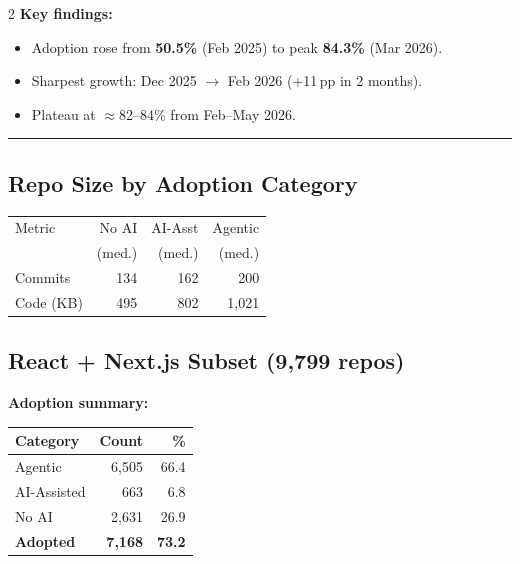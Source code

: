 \documentclass[10pt,a4paper]{article}
\begin{document}
\begin{multicols}{2}
\vspace{3pt}
\textbf{Key findings:}
\begin{itemize}\setlength\itemsep{0pt}
  \item Adoption rose from \textbf{50.5\%} (Feb 2025)
        to peak \textbf{84.3\%} (Mar 2026).
  \item Sharpest growth: Dec 2025 $\to$ Feb 2026
        (+11\,pp in 2 months).
  \item Plateau at $\approx$82--84\% from Feb--May 2026.
\end{itemize}

\vspace{3pt}
\hrule
\vspace{3pt}

\subsection*{Repo Size by Adoption Category}


\vspace{2pt}
\begin{tabular}{@{}lrrr@{}}
\toprule
Metric & No AI & AI-Asst & Agentic \\
       & (med.)& (med.)  & (med.)  \\
\midrule
Commits   & 134 & 162 & 200 \\
Code (KB) & 495 & 802 & 1{,}021 \\
\bottomrule
\end{tabular}

\vspace{2pt}


\columnbreak

\subsection*{React + Next.js Subset (9,799 repos)}

\textbf{Adoption summary:}

\vspace{2pt}
\begin{tabular}{@{}lrr@{}}
\toprule
Category & Count & \% \\
\midrule
Agentic         & 6,505 & 66.4 \\
AI-Assisted     &   663 &  6.8 \\
No AI           & 2,631 & 26.9 \\
\midrule
\textbf{Adopted}& \textbf{7,168} & \textbf{73.2} \\
\bottomrule
\end{tabular}


\end{multicols}
\end{document}

